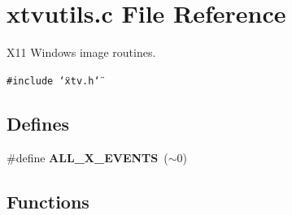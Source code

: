 \section{xtvutils.c File Reference}
\label{xtvutils_8c}
X11 Windows image routines. 

{\tt \#include \char`\"{}xtv.h\char`\"{}}\par
\subsection*{Defines}
\begin{CompactItemize}
\item 
\#define {\bf ALL\_\-X\_\-EVENTS}\ ($\sim$0)\label{xtvutils_8c_a0}

\end{CompactItemize}
\subsection*{Functions}
